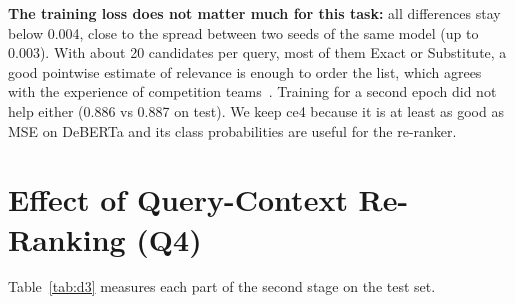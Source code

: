 \documentclass[12pt,a4paper]{report}
\begin{document}
\begin{table}[H]
\centering
\caption{Supplementary loss comparisons on validation: paired difference $b - a$ in nDCG, per query averaged over seeds, with the 95\% bootstrap interval over the 2,089 queries. ``Same sign'': the difference has the same sign for every seed.}
\label{tab:losssupp}
\small
{}
\end{table}

\textbf{The training loss does not matter much for this task:} all differences stay below 0.004, close to the spread between two seeds of the same model (up to 0.003). With about 20 candidates per query, most of them Exact or Substitute, a good pointwise estimate of relevance is enough to order the list, which agrees with the experience of competition teams~\cite{second}. Training for a second epoch did not help either (0.886 vs 0.887 on test). We keep ce4 because it is at least as good as MSE on DeBERTa and its class probabilities are useful for the re-ranker.

\section{Effect of Query-Context Re-Ranking (Q4)}\label{sec:rerank}
Table~\ref{tab:d3} measures each part of the second stage on the test set.
\end{document}
